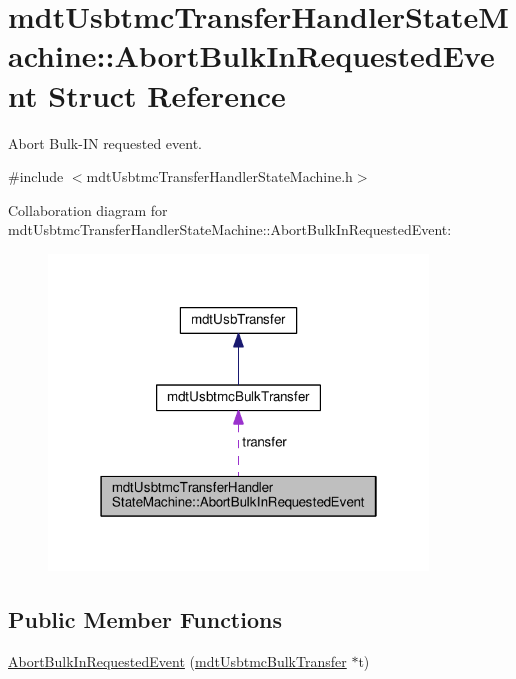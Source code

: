 \hypertarget{structmdt_usbtmc_transfer_handler_state_machine_1_1_abort_bulk_in_requested_event}{\section{mdt\-Usbtmc\-Transfer\-Handler\-State\-Machine\-:\-:Abort\-Bulk\-In\-Requested\-Event Struct Reference}
\label{structmdt_usbtmc_transfer_handler_state_machine_1_1_abort_bulk_in_requested_event}
}


Abort Bulk-\/\-I\-N requested event.  




{\ttfamily \#include $<$mdt\-Usbtmc\-Transfer\-Handler\-State\-Machine.\-h$>$}



Collaboration diagram for mdt\-Usbtmc\-Transfer\-Handler\-State\-Machine\-:\-:Abort\-Bulk\-In\-Requested\-Event\-:\nopagebreak
\begin{figure}[H]
\begin{center}
\leavevmode
\includegraphics[width=286pt]{structmdt_usbtmc_transfer_handler_state_machine_1_1_abort_bulk_in_requested_event__coll__graph}
\end{center}
\end{figure}
\subsection*{Public Member Functions}
\begin{DoxyCompactItemize}
\item 
\hyperlink{structmdt_usbtmc_transfer_handler_state_machine_1_1_abort_bulk_in_requested_event_a6c29c6e020357b9abd59452f988bfd63}{Abort\-Bulk\-In\-Requested\-Event} (\hyperlink{classmdt_usbtmc_bulk_transfer}{mdt\-Usbtmc\-Bulk\-Transfer} $\ast$t)
\end{DoxyCompactItemize}
